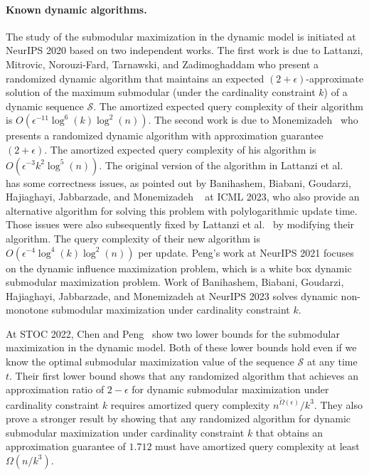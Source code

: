 \documentclass[11pt]{article}
\begin{document}
\paragraph{Known dynamic algorithms.} 
The study of the submodular maximization in the dynamic model is initiated 
at NeurIPS 2020 based on two independent works. 
The first work is due to Lattanzi, Mitrovic, Norouzi-Fard, Tarnawski, and Zadimoghaddam \cite{DBLP:conf/nips/LattanziMNTZ20} 
who present a randomized dynamic algorithm 
that maintains an expected $(2+\epsilon)$-approximate solution of the maximum submodular (under the cardinality constraint $k$) 
of a dynamic sequence $\mathcal{S}$. The amortized expected query complexity of their algorithm 
is $O(\epsilon^{-11}\log^6(k)\log^2(n))$. 
The second work is due to Monemizadeh~\cite{DBLP:conf/nips/Monemizadeh20} who 
presents a randomized dynamic  
algorithm with approximation guarantee $(2+\epsilon)$. 
The amortized expected query complexity of his algorithm is 
$O(\epsilon^{-3}k^2\log^5(n))$.
The original version of the algorithm in Lattanzi et al.~\cite{DBLP:conf/nips/LattanziMNTZ20} has some correctness issues, as pointed out by Banihashem, Biabani, Goudarzi, Hajiaghayi, Jabbarzade, and Monemizadeh ~\cite{pmlr-v202-banihashem23a} at ICML 2023, who also provide an alternative algorithm for solving this problem with polylogarithmic update time.
Those issues were also subsequently fixed by Lattanzi et al.~\cite{LattanziMNTZ20update} by modifying their algorithm. The query complexity of their new algorithm is $O(\epsilon^{-4}\log^4(k)\log^2(n))$ per update.
Peng's work at NeurIPS 2021 \cite{DBLP:conf/nips/Peng21} focuses on the dynamic influence maximization problem, which is a white box dynamic submodular maximization problem.
Work of Banihashem, Biabani, Goudarzi, Hajiaghayi, Jabbarzade, and Monemizadeh \cite{nonbanihashem2023dynamic} at NeurIPS 2023 solves dynamic non-monotone submodular maximization under cardinality constraint $k$.

At STOC 2022, Chen and Peng~\cite{DBLP:journals/corr/abs-2111-03198} show two lower bounds for the submodular maximization in the dynamic model. Both of these lower bounds hold even if we know the optimal submodular maximization value of the sequence $\mathcal{S}$ at any time $t$. Their first lower bound shows that any randomized algorithm that achieves an approximation ratio of $2-\epsilon$ for dynamic submodular maximization under cardinality constraint $k$ 
requires amortized query complexity  $n^{\tilde{\Omega}(\epsilon)}/k^3$. 
They also prove a stronger result by showing that any randomized algorithm for dynamic submodular maximization under cardinality constraint $k$ that obtains an approximation guarantee of $1.712$ must have amortized query complexity at least $\Omega(n/k^3)$. 
\end{document}
